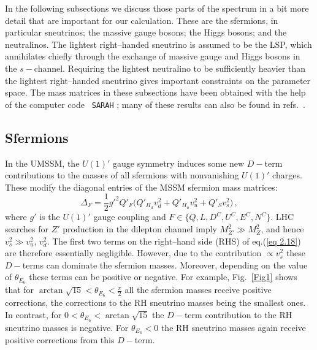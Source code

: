 \documentclass[a4paper,11pt]{article}
\begin{document}
In the following subsections we discuss those parts of the spectrum in
a bit more detail that are important for our calculation. These are
the sfermions, in particular sneutrinos; the massive gauge bosons; the
Higgs bosons; and the neutralinos. The lightest right--handed
sneutrino is assumed to be the LSP, which annihilates chiefly through
the exchange of massive gauge and Higgs bosons in the
$s-$channel. Requiring the lightest neutralino to be sufficiently
heavier than the lightest right--handed sneutrino gives important
constraints on the parameter space. The mass matrices in these
subsections have been obtained with the help of the computer code {\tt
  SARAH} \cite{Staub:2008uz, Staub:2013tta, Staub:2015kfa}; many of
these results can also be found in refs.~\cite{Belanger:2011rs,
  Belanger:2015cra, Belanger:2017vpq}.

\subsection{Sfermions}
\label{section2.2}

In the UMSSM, the $U(1)'$ gauge symmetry induces some new $D-$term
contributions to the masses of all sfermions with nonvanishing $U(1)'$
charges.  These modify the diagonal entries of the MSSM sfermion mass
matrices:
%
\begin{equation} \label{eq 2.18}
\Delta_{F} = \frac{1}{2} g'^2 Q'_F \Big( Q'_{H_d} v_d^2  + Q'_{H_u} v_u^2  
+ Q'_S v_s^2 \Big)\,, 
\end{equation}
%
where $g'$ is the $U(1)'$ gauge coupling and
$F\in \{Q,L,D^C,U^C,E^C,N^C\}$. LHC searches for $Z'$ production in
the dilepton channel imply \cite{pdg} $M^2_{Z'} \gg M^2_Z$, and hence
$v_s^2 \gg v_u^2, \, v_d^2$. The first two terms on the right--hand
side (RHS) of eq.(\ref{eq 2.18}) are therefore essentially
negligible. However, due to the contribution $\propto v_s^2$ these
$D-$terms can dominate the sfermion masses. Moreover, depending on the
value of $\theta_{E_6}$ these terms can be positive or negative. For
example, Fig.~\ref{Fig1} shows that for
$\arctan\sqrt{15} < \theta_{E_6} < \frac{\pi}{2}$ all the sfermion
masses receive positive corrections, the corrections to the RH
sneutrino masses being the smallest ones. In contrast, for
$0 < \theta_{E_6} < \arctan\sqrt{15}$ the $D-$term contribution to the
RH sneutrino masses is negative. For $\theta_{E_6} < 0$ the RH
sneutrino masses again receive positive corrections from this
$D-$term.
\end{document}

